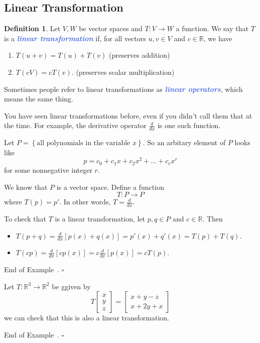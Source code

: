 \documentclass[10pt]{article}
\newcommand{\demph}[1]{\textcolor{RoyalBlue}{\textbf{\slshape #1}}} %
\theoremstyle{definition}
\newtheorem{definition}[theorem]{Definition}
\newtheorem{example}[theorem]{Example}
\renewenvironment{example}
{\begin{oldexample}}
  {\par\smallskip\hfill   End of Example~\theexample. $\square$    \par\end{oldexample}}
\newcommand{\R}{\mathbb{R}}           %
\begin{document}
\subsection{Linear Transformation}
\begin{definition}
  Let $V,W$ be vector spaces and $T:V \to W$ a function. We say that $T$ is a
  \demph{linear transformation} if, for all vectors $u,v\in V$ and $c\in \R$,
  we have
  \begin{enumerate}[label=(\roman*)]
    \item $T(u+v)= T(u)+T(v) $ \quad (preserves addition)
    \item $T(cV)= cT(v)$.  \quad (preserves scalar multiplication)
  \end{enumerate}
  Sometimes people refer to linear transformations as \demph{linear
    operators}, which means the same thing.
\end{definition}

You have seen linear transformations before, even if you didn't call them that
at the time. For example, the derivative operator $\frac{d}{dx}$ is one such
function.

\begin{example}
  Let $P= \left\{ \text{all polynomials in the variable }x\right\}$. So an
  arbitary element of $P$ looks like
  \begin{equation*}
    p = c_{0}+c_{1}x+c_{2}x^{2}+\ldots+c_{r}x^{r}
  \end{equation*}
  for some nonnegative integer $r$.
  
  We know that $P$ is a vector space. Define a function
  \begin{equation*}
    T: P \to P
  \end{equation*}
  where $T(p) = p'$. In other words, $T= \frac{d}{dx}$.

  To check that $T$ is a linear transformation, let $p,q\in P$ and $c\in \R$. Then
  \begin{itemize}
    \item $T(p+q) = \frac{d}{dx}\left[ p(x)+q(x) \right]= p'(x)+q'(x) =
    T(p)+ T(q)$. 
    \item $T(cp)= \frac{d}{dx}\left[ cp(x) \right]= c \frac{d}{dx} \left[ p(x)
    \right] = c T(p)$.
  \end{itemize}
\end{example}

\begin{example}
  Let $T:\R^{3}\to \R^{2}$ be ggiven by
  \begin{equation*}
    T
    \begin{bmatrix}
      x\\y\\z
    \end{bmatrix}
    =
    \begin{bmatrix}
      x+y-z\\
      x+2y+x
    \end{bmatrix}
  \end{equation*}
  we can check that this is also a linear transformation.
\end{example}
\end{document}

